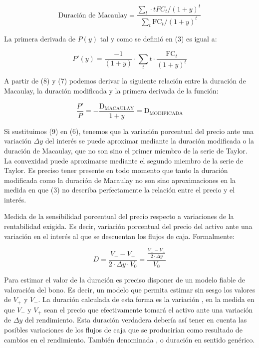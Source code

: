 \documentclass{nuevotema}
\begin{document}
\begin{equation}
\text{Duración de Macaulay} =\frac{\sum_t \cdot t {FC}_{t}/(1+y)^{t}}{ \sum_t \text{FC}_{t}/(1+y)^t } 
\end{equation}

La primera derivada de $P(y)$ tal y como se definió en (3) es igual a:

\begin{equation}
P'(y) = \frac{-1}{(1+y)} \cdot \sum_t t \cdot \frac{\text{FC}_t}{(1+y)^t}
\end{equation}

A partir de (8) y (7) podemos derivar la siguiente relación entre la duración de Macaulay, la duración modificada y la primera derivada de la función: 

\begin{equation}
\frac{P'}{P} = - \frac{\text{D}_\text{MACAULAY}}{1+y} = \text{D}_\text{MODIFICADA}
\end{equation}

Si sustituimos (9) en (6), tenemos que la variación porcentual del precio ante una variación $\Delta y$ del interés se puede aproximar mediante la duración modificada o la duración de Macaulay, que no son sino el primer miembro de la serie de Taylor. La convexidad puede aproximarse mediante el segundo miembro de la serie de Taylor. Es preciso tener presente en todo momento que tanto la duración modificada como la duración de Macaulay no son sino aproximaciones en la medida en que (3) no describa perfectamente la relación entre el precio y el interés.

Medida de la sensibilidad porcentual del precio respecto a variaciones de la rentabilidad exigida. Es decir, variación porcentual del precio del activo ante una variación en el interés al que se descuentan los flujos de caja. Formalmente:

\begin{equation}
D = \frac{V_- - V_+}{2 \cdot \varDelta y \cdot V_0} = \frac{\frac{V_- - V_+}{2 \cdot \varDelta y}}{V_0}
\end{equation}

Para estimar el valor de la duración es preciso disponer de un modelo fiable de valoración del bono. Es decir, un modelo que permita estimar sin sesgo los valores de $V_+$ y $V_-$. La duración calculada de esta forma es la variación , en la medida en que $V_-$ y $V_+$ sean el precio que efectivamente tomará el activo ante una variación de $\varDelta y$ del rendimiento. Esta duración verdadera debería así tener en cuenta las posibles variaciones de los flujos de caja que se producirían como resultado de cambios en el rendimiento. También denominada , o duración en sentido genérico.
\end{document}
